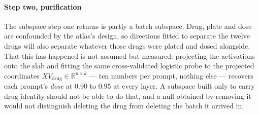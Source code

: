\paragraph{Step two, purification} The subspace step one returns is partly a
batch subspace. Drug, plate and dose are confounded by the atlas's design, so
directions fitted to separate the twelve drugs will also separate whatever
those drugs were plated and dosed alongside. That this has happened is not
assumed but measured: projecting the activations onto the slab and fitting the
same cross-validated logistic probe to the projected coordinates
$X V_{\textrm{drug}} \in \mathbb{R}^{n \times k}$ --- ten numbers per prompt,
nothing else --- recovers each prompt's \emph{dose} at $0.90$ to $0.95$ at
every layer. A subspace built only to carry drug identity should not be able to
do that, and a null obtained by removing it would not distinguish deleting the
drug from deleting the batch it arrived in.

